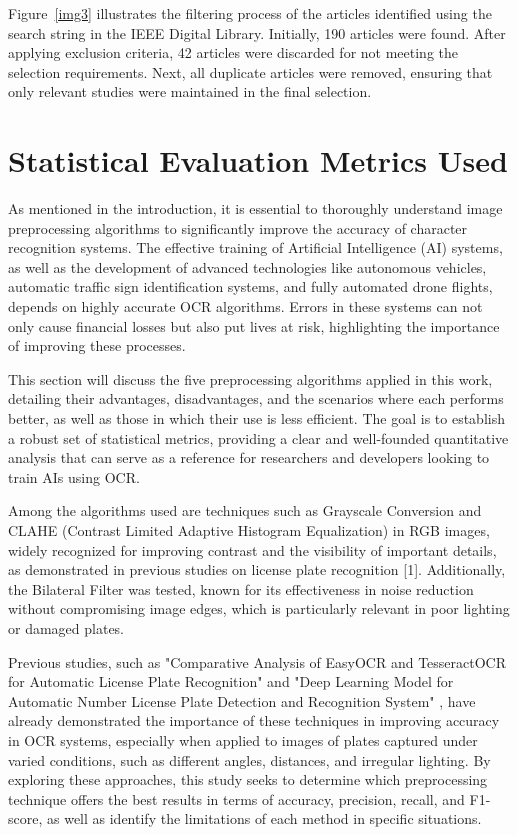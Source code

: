 \documentclass[conference]{IEEEtran}
\begin{document}
	Figure~\ref{img3} illustrates the filtering process of the articles identified using the search string in the IEEE Digital Library. Initially, 190 articles were found. After applying exclusion criteria, 42 articles were discarded for not meeting the selection requirements. Next, all duplicate articles were removed, ensuring that only relevant studies were maintained in the final selection.
	
	\section{Statistical Evaluation Metrics Used}
	
	As mentioned in the introduction, it is essential to thoroughly understand image preprocessing algorithms to significantly improve the accuracy of character recognition systems. The effective training of Artificial Intelligence (AI) systems, as well as the development of advanced technologies like autonomous vehicles, automatic traffic sign identification systems, and fully automated drone flights, depends on highly accurate OCR algorithms. Errors in these systems can not only cause financial losses but also put lives at risk, highlighting the importance of improving these processes.
	
	This section will discuss the five preprocessing algorithms applied in this work, detailing their advantages, disadvantages, and the scenarios where each performs better, as well as those in which their use is less efficient. The goal is to establish a robust set of statistical metrics, providing a clear and well-founded quantitative analysis that can serve as a reference for researchers and developers looking to train AIs using OCR.
	
	Among the algorithms used are techniques such as Grayscale Conversion and CLAHE (Contrast Limited Adaptive Histogram Equalization) in RGB images, widely recognized for improving contrast and the visibility of important details, as demonstrated in previous studies on license plate recognition [1]. Additionally, the Bilateral Filter was tested, known for its effectiveness in noise reduction without compromising image edges, which is particularly relevant in poor lighting or damaged plates.
	
	Previous studies, such as "Comparative Analysis of EasyOCR and TesseractOCR for Automatic License Plate Recognition" \cite{b1} and "Deep Learning Model for Automatic Number License Plate Detection and Recognition System" \cite{b2}, have already demonstrated the importance of these techniques in improving accuracy in OCR systems, especially when applied to images of plates captured under varied conditions, such as different angles, distances, and irregular lighting. By exploring these approaches, this study seeks to determine which preprocessing technique offers the best results in terms of accuracy, precision, recall, and F1-score, as well as identify the limitations of each method in specific situations.
	
\end{document}

